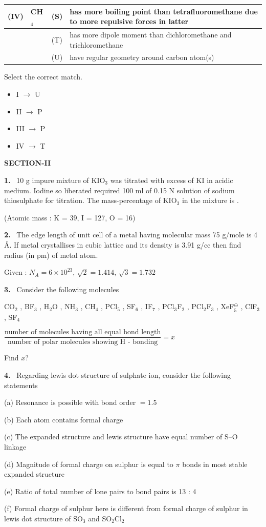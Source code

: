 \documentclass[10pt]{extarticle}
\newcommand{\sect}[1]{\par\smallskip\noindent\textbf{#1}\par}
\newcommand{\qn}[1]{\par\smallskip\noindent\textbf{#1.}~}
\newenvironment{qoptions}{\begin{itemize}[leftmargin=1.8em,itemsep=1pt,topsep=2pt,label={}]}{\end{itemize}}
\newcommand{\opt}[2]{\item[(#1)] #2}
\begin{document}
\begin{multicols}{2}
\begin{center}
\begin{tabular}{|L{0.8cm}L{1.3cm}|L{0.6cm}L{3.9cm}|}
(IV)&CH$_4$&(S)&has more boiling point than tetrafluoromethane due to more repulsive forces in latter\\\hline
&&(T)&has more dipole moment than dichloromethane and trichloromethane\\\hline
&&(U)&have regular geometry around carbon atom(s)\\\hline
\end{tabular}\end{center}
Select the correct match.
\begin{qoptions}
\opt{A}{I $\to$ U}
\opt{B}{II $\to$ P}
\opt{C}{III $\to$ P}
\opt{D}{IV $\to$ T}
\end{qoptions}
\sect{SECTION-II}
\qn{1} 10 g impure mixture of KIO$_3$ was titrated with excess of KI in acidic medium. Iodine so liberated required 100 ml of 0.15 N solution of sodium thiosulphate for titration. The mass-percentage of KIO$_3$ in the mixture is \underline{\hspace{1.5cm}} .

(Atomic mass : K = 39, I = 127, O = 16)
\qn{2} The edge length of unit cell of a metal having molecular mass 75 g/mole is 4 \AA. If metal crystallises in cubic lattice and its density is 3.91 g/cc then find radius (in pm) of metal atom.

Given : $N_A=6\times10^{23}$, $\sqrt2=1.414$, $\sqrt3=1.732$
\qn{3} Consider the following molecules

CO$_2$ , BF$_3$ , H$_2$O , NH$_3$ , CH$_4$ , PCl$_5$ , SF$_6$ , IF$_7$ , PCl$_3$F$_2$ , PCl$_2$F$_3$ , XeF$_5^\ominus$ , ClF$_3$ , SF$_4$

$\dfrac{\text{number of molecules having all equal bond length}}{\text{number of polar molecules showing H - bonding}}=x$

Find $x$?
\qn{4} Regarding lewis dot structure of sulphate ion, consider the following statements

(a) Resonance is possible with bond order $=1.5$

(b) Each atom contains formal charge

(c) The expanded structure and lewis structure have equal number of S--O linkage

(d) Magnitude of formal charge on sulphur is equal to $\pi$ bonds in most stable expanded structure

(e) Ratio of total number of lone pairs to bond pairs is 13 : 4

(f) Formal charge of sulphur here is different from formal charge of sulphur in lewis dot structure of SO$_3$ and SO$_2$Cl$_2$


\end{multicols}
\end{document}
